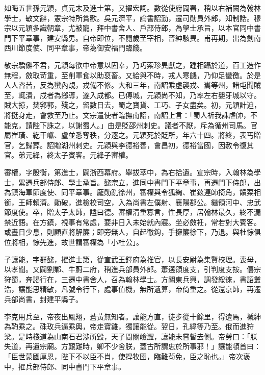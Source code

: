 \begin{pinyinscope}
 如晦五世孫元穎，貞元末及進士第，又擢宏詞。數從使府闢署，稍以右補闕為翰林學士，敏文辭，憲宗特所賞歡。吳元濟平，論書詔勤，遷司勛員外郎，知制誥。穆宗以元穎多識朝章，尤被寵，拜中書舍人、戶部侍郎，為學士承旨，以本官同中書門下平章事，建安縣男。自帝即位，不閱歲至宰相，晉紳駭異。甫再期，出為劍南西川節度使、同平章事，帝為御安福門臨餞。



 敬宗驕僻不君，元穎每欲中帝意以固幸，乃巧索珍異獻之，踵相躡於道，百工造作無程，斂取苛重，至削軍食以助裒畜。又給與不時，戎人寒饑，乃仰足蠻徼。於是人人咨苦，反為蠻內覘，戎備不修。大和三年，南詔乘虛襲戎、巂等州，諸屯聞賊至，輒潰，戍者為鄉導，遂入成都。已傅城，元穎尚不知，乃率左右嬰牙城以守。賊大掠，焚郛郭，殘之，留數日去，蜀之寶貨、工巧、子女盡矣。初，元穎計迫，將挺身走，會救至乃止。文宗遣使者臨撫南詔，南詔上言：「蜀人祈我誅虐帥，不能克，請陛下誅之，以謝蜀人。」由是貶邵州刺史。議者不厭，斥為循州司馬。官屬崔璜、紇干巘、盧並悉奪秩，分逐之。元穎死於貶所，年六十四。將終，表丐贈官，乞歸葬。詔贈湖州刺史。元穎與李德裕善，會昌初，德裕當國，因赦令復其官。弟元絳，終太子賓客。元絳子審權。



 審權，字殷衡，第進士，闢浙西幕府。舉拔萃中，為右拾遺。宣宗時，入翰林為學士，累遷兵部侍郎、學士承旨。懿宗立，進同中書門下平章事，再遷門下侍郎，出為鎮海軍節度使、同平章事。龐勛亂徐州，審權與令狐綯、崔鉉連師掎角，饋粟相銜，王師賴濟。勛破，進檢校司空，入為尚書左僕射、襄陽郡公。繼領河中、忠武節度使。卒，贈太子太師，謚曰德。審權清重寡言，性長厚，居翰林最久，終不漏禁近語。在方鎮，視事有常處，要非日入未始就內寢。坐必斂衽，常若對大賓客。或晝日少息，則顧直將解簾；即旁無人，自起徹鉤，手擁簾徐下，乃退。與杜悰俱位將相，悰先進，故世謂審權為「小杜公」。



 子讓能，字群懿，擢進士第，從宣武王鐸府為推官，以長安尉為集賢校理。喪母，以孝聞。又闢劉鄴、牛蔚二府，稍進兵部員外郎。蕭遘領度支，引判度支按。僖宗狩蜀，奔謁行在，三遷中書舍人，召為翰林學士。方關東兵興，調發綏徠，書詔叢浩，讓能思精敏，凡號令行下，處事值機，無所遺算，帝倚重之。從還京師，再遷兵部尚書，封建平縣子。



 李克用兵至，帝夜出鳳翔，蒼黃無知者。讓能方直，徒步從十餘里，得遺馬，褫紳為靮乘之。硃玫兵逼乘輿，帝走寶雞，獨讓能從。翌日，孔緯等乃至。俄而進狩梁。是時棧道為山南石君涉所毀，天子間關嶮澀，讓能未嘗暫去側。帝勞曰：「朕失道，再遺宗廟。方艱難時，卿不少舍朕，蓋古所謂忠於所事邪！」讓能頓首曰：「臣世蒙國厚恩，陛下不以臣不肖，使捍牧圉，臨難茍免，臣之恥也。」帝次褒中，擢兵部侍郎、同中書門下平章事。




\end{pinyinscope}
